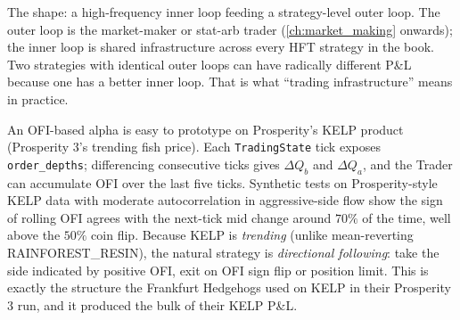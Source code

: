 The shape: a high-frequency inner loop feeding a strategy-level
outer loop. The outer loop is the market-maker or stat-arb
trader (\cref{ch:market_making} onwards); the inner loop is
shared infrastructure across every HFT strategy in the book.
Two strategies with identical outer loops can have radically
different P\&L because one has a better inner loop. That is what
``trading infrastructure'' means in practice.

\begin{prosperitybox}
An OFI-based alpha is easy to prototype on Prosperity's KELP
product (Prosperity 3's trending fish price). Each
\texttt{TradingState} tick exposes \texttt{order\_depths};
differencing consecutive ticks gives $\Delta Q_b$ and
$\Delta Q_a$, and the Trader can accumulate OFI over the last
five ticks. Synthetic tests on Prosperity-style KELP data with
moderate autocorrelation in aggressive-side flow show the sign
of rolling OFI agrees with the next-tick mid change around
$70\%$ of the time, well above the $50\%$ coin flip. Because
KELP is \emph{trending} (unlike mean-reverting
RAINFOREST\_RESIN), the natural strategy is \emph{directional
following}: take the side indicated by positive OFI, exit on OFI
sign flip or position limit. This is exactly the structure the
Frankfurt Hedgehogs used on KELP in their Prosperity 3 run, and
it produced the bulk of their KELP P\&L.
\end{prosperitybox}

